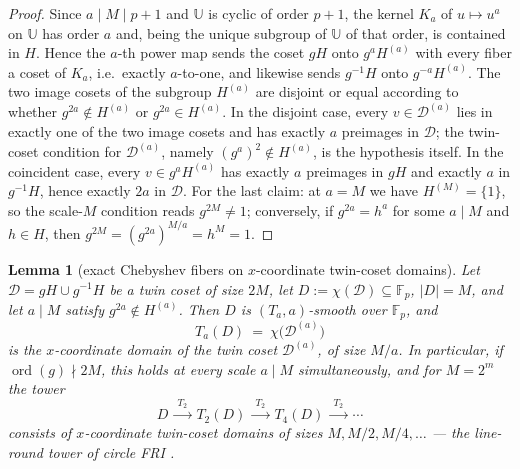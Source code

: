 \documentclass[11pt]{article}
\newtheorem{lemma}[theorem]{Lemma}
\theoremstyle{definition}
\theoremstyle{remark}
\newcommand{\F}{\mathbb{F}}
\newcommand{\UU}{\mathbb{U}}
\begin{document}
\begin{proof}
Since $a\mid M\mid p+1$ and $\UU$ is cyclic of order $p+1$, the kernel $K_a$ of $u\mapsto u^a$ on $\UU$ has order $a$ and, being the unique subgroup of $\UU$ of that order, is contained in $H$. Hence the $a$-th power map sends the coset $gH$ onto $g^aH^{(a)}$ with every fiber a coset of $K_a$, i.e.\ exactly $a$-to-one, and likewise sends $g^{-1}H$ onto $g^{-a}H^{(a)}$. The two image cosets of the subgroup $H^{(a)}$ are disjoint or equal according to whether $g^{2a}\notin H^{(a)}$ or $g^{2a}\in H^{(a)}$. In the disjoint case, every $v\in\mathcal D^{(a)}$ lies in exactly one of the two image cosets and has exactly $a$ preimages in $\mathcal D$; the twin-coset condition for $\mathcal D^{(a)}$, namely $(g^a)^2\notin H^{(a)}$, is the hypothesis itself. In the coincident case, every $v\in g^aH^{(a)}$ has exactly $a$ preimages in $gH$ and exactly $a$ in $g^{-1}H$, hence exactly $2a$ in $\mathcal D$. For the last claim: at $a=M$ we have $H^{(M)}=\{1\}$, so the scale-$M$ condition reads $g^{2M}\ne1$; conversely, if $g^{2a}=h^a$ for some $a\mid M$ and $h\in H$, then $g^{2M}=(g^{2a})^{M/a}=h^{M}=1$.
\end{proof}

\begin{lemma}[exact Chebyshev fibers on $x$-coordinate twin-coset domains]\label{lem:cheb-fibers}
Let $\mathcal D=gH\cup g^{-1}H$ be a twin coset of size $2M$, let $D:=\chi(\mathcal D)\subseteq\F_p$, $|D|=M$, and let $a\mid M$ satisfy $g^{2a}\notin H^{(a)}$. Then $D$ is $(T_a,a)$-smooth over $\F_p$, and
\[
T_a(D)\ =\ \chi\bigl(\mathcal D^{(a)}\bigr)
\]
is the $x$-coordinate domain of the twin coset $\mathcal D^{(a)}$, of size $M/a$. In particular, if $\operatorname{ord}(g)\nmid2M$, this holds at every scale $a\mid M$ simultaneously, and for $M=2^m$ the tower
\[
D\ \xrightarrow{\ T_2\ }\ T_2(D)\ \xrightarrow{\ T_2\ }\ T_4(D)\ \xrightarrow{\ T_2\ }\ \cdots
\]
consists of $x$-coordinate twin-coset domains of sizes $M,M/2,M/4,\dots$ --- the line-round tower of circle FRI \cite{HLP24}.
\end{lemma}
\end{document}
